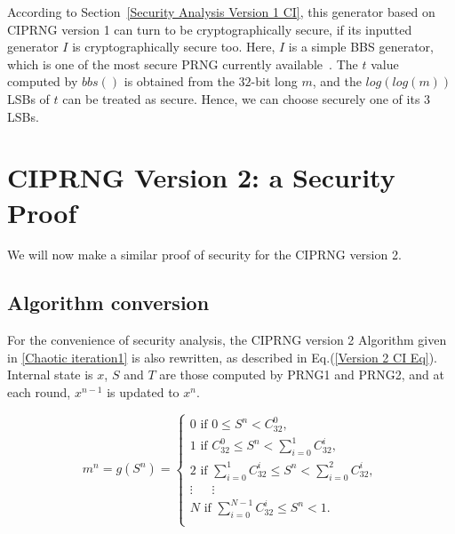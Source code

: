 According to Section~\ref{Security Analysis Version 1 CI}, this generator based on CIPRNG version 1 can turn to be cryptographically secure, if its inputted generator $I$ is cryptographically secure too. Here, $I$ is a simple BBS generator, which is one of the most secure PRNG currently available~\cite{vmd}. The $t$ value computed by $bbs()$ is obtained from
the $32$-bit long $m$, and the $log(log(m))$ LSBs of $t$ can be treated as secure. Hence, 
we can choose securely one of its $3$ LSBs.

\section{CIPRNG Version 2: a Security Proof}
\label{Security Analysis Version 2 CI}

We will now make a similar proof of security for the CIPRNG version 2.

\subsection{Algorithm conversion}
For the convenience of security analysis, the CIPRNG version 2 Algorithm given in \ref{Chaotic iteration1} is also rewritten, as described in
Eq.(\ref{Version 2 CI Eq}). Internal state is $x$, $S$ and $T$ are those computed by PRNG1 and PRNG2, 
and at each round, $x^{n-1}$ is updated to $x^n$. 

\begin{equation}
\label{g}
m^n = g(S^n)=
\left\{
\begin{array}{l}
0 \text{ if }0 \leqslant{S^n}<{C^0_{32}},\\
1 \text{ if }{C^0_{32}} \leqslant{S^n}<\sum_{i=0}^1{C^i_{32}},\\
2 \text{ if }\sum_{i=0}^1{C^i_{32}} \leqslant{S^n}<\sum_{i=0}^2{C^i_{32}},\\
\vdots~~~~~ ~~\vdots~~~ ~~~~\\
N \text{ if }\sum_{i=0}^{N-1}{C^i_{32}}\leqslant{S^n}<1.\\
\end{array}
\right.
\end{equation}

